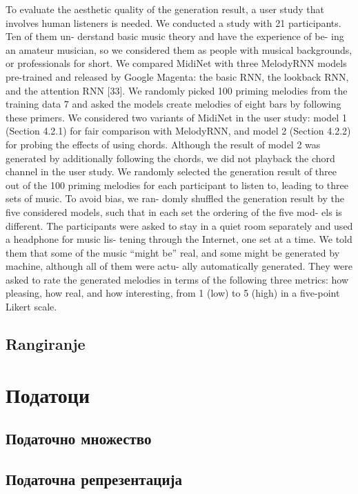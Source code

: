 \cite{MidiNet} To evaluate the aesthetic quality of the generation result, a user study that involves human listeners is needed. We conducted a study with 21 participants. Ten of them un- derstand basic music theory and have the experience of be- ing an amateur musician, so we considered them as people with musical backgrounds, or professionals for short. We compared MidiNet with three MelodyRNN models pre-trained and released by Google Magenta: the basic RNN, the lookback RNN, and the attention RNN [33]. We randomly picked 100 priming melodies from the training data 7 and asked the models create melodies of eight bars by following these primers. We considered two variants of MidiNet in the user study: model 1 (Section 4.2.1) for fair comparison with MelodyRNN, and model 2 (Section 4.2.2) for probing the effects of using chords. Although the result of model 2 was generated by additionally following the chords, we did not playback the chord channel in the user study. We randomly selected the generation result of three out of the 100 priming melodies for each participant to listen to, leading to three sets of music. To avoid bias, we ran- domly shuffled the generation result by the five considered models, such that in each set the ordering of the five mod- els is different. The participants were asked to stay in a quiet room separately and used a headphone for music lis- tening through the Internet, one set at a time. We told them that some of the music “might be” real, and some might be generated by machine, although all of them were actu- ally automatically generated. They were asked to rate the generated melodies in terms of the following three metrics: how pleasing, how real, and how interesting, from 1 (low) to 5 (high) in a five-point Likert scale.

\section{Rangiranje}

\cite{GarciaSalas2011}

\chapter{Податоци}

\section{Податочно множество}

\section{Податочна репрезентација }

